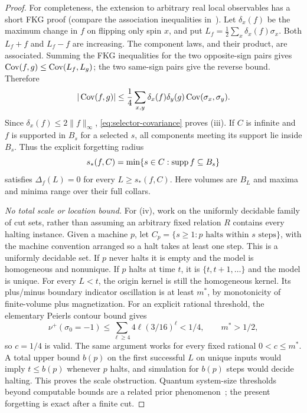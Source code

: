 \begin{proof}
For completeness, the extension to arbitrary real local observables has a
short FKG proof (compare the association inequalities in~\cite{BulinskiShashkin2007}).
Let $\delta_x(f)$ be the maximum change in $f$ on flipping only spin $x$, and
put $L_f=\frac12\sum_x\delta_x(f)\sigma_x$.
Both $L_f+f$ and $L_f-f$ are increasing. The component laws, and their product,
are associated. Summing the FKG inequalities for the two opposite-sign pairs
gives $\operatorname{Cov}(f,g)\le\operatorname{Cov}(L_f,L_g)$; the two same-sign pairs give the reverse
bound. Therefore
\[
 |\operatorname{Cov}(f,g)|\le\frac14\sum_{x,y}\delta_x(f)\delta_y(g)
                   \operatorname{Cov}(\sigma_x,\sigma_y).
\]
Since $\delta_x(f)\le2\|f\|_\infty$, \eqref{eq:selector-covariance} proves
(iii).
If $C$ is infinite and $f$ is supported in $B_s$ for a selected $s$, all
components meeting its support lie inside $B_s$. Thus the explicit forgetting
radius
\[
 s_*(f,C)=\min\{s\in C:\operatorname{supp} f\subseteq B_s\}
\]
satisfies $\Delta_f(L)=0$ for every $L\ge s_*(f,C)$. Here volumes are $B_L$
and maxima and minima range over their full collars.

\emph{No total scale or location bound.}
For (iv), work on the uniformly decidable family of cut sets, rather than
assuming an arbitrary fixed relation $R$ contains every halting instance.
Given a machine $p$, let $C_p=\{s\ge1:p\text{ halts within }s\text{ steps}\}$,
with the machine convention arranged so a halt takes at least one step.
This is a uniformly decidable set. If $p$ never halts it is empty and the
model is homogeneous and nonunique. If $p$ halts at time $t$, it is
$\{t,t+1,\ldots\}$ and the model is unique. For every $L<t$, the origin kernel
is still the homogeneous kernel. Its plus/minus boundary indicator
oscillation is at least $m^*$, by monotonicity of finite-volume plus
magnetization. For an explicit rational threshold, the elementary Peierls
contour bound gives
\[
 \nu^+(\sigma_0=-1)\le\sum_{\ell\ge4}4\ell(3/16)^\ell<1/4,
 \qquad m^*>1/2,
\]
so $c=1/4$ is valid. The same argument works for every fixed rational
$0<c\le m^*$. A total upper bound $b(p)$ on the first successful $L$ on unique
inputs would imply $t\le b(p)$ whenever $p$ halts, and simulation for $b(p)$
steps would decide halting. This proves the scale obstruction. Quantum
system-size thresholds beyond computable bounds are a related prior
phenomenon~\cite{BCLPW2018}; the present forgetting is exact after a finite cut.


\end{proof}
